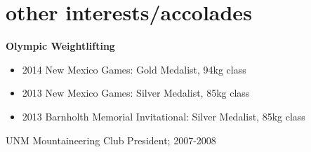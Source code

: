 \documentclass[]{friggeri-cv} %
\begin{document}

\section{other interests/accolades}
\textbf{Olympic Weightlifting}
\begin{itemize}
\item 2014 New Mexico Games: Gold Medalist, 94kg class
\item 2013 New Mexico Games: Silver Medalist, 85kg class
\item 2013 Barnholth Memorial Invitational: Silver Medalist, 85kg class
\end{itemize}
UNM Mountaineering Club President; 2007-2008
\end{document}
